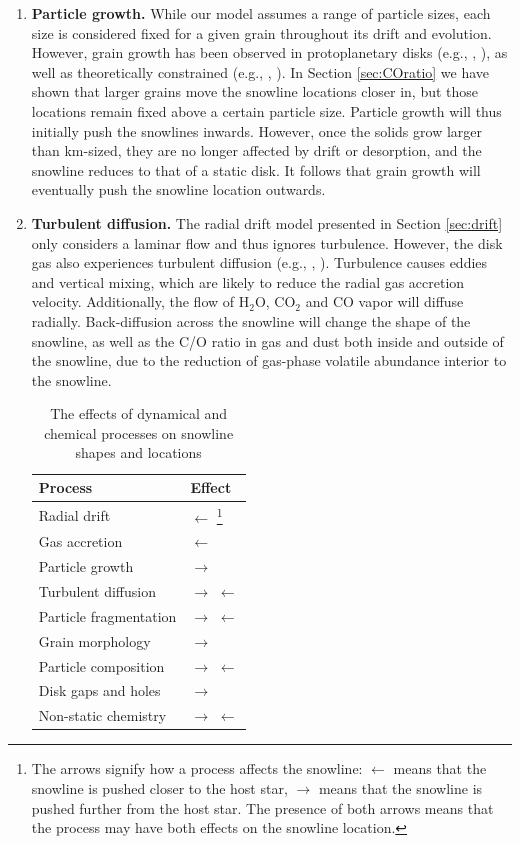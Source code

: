\documentclass[apj]{emulateapj}
\begin{document}
\begin{enumerate}
\item \textbf{Particle growth.} While our model assumes a range of particle sizes, each size is considered fixed for a given grain throughout its drift and evolution. However, grain growth has been observed in protoplanetary disks (e.g., \citealt{ricci10}, \citealt{perez12}), as well as theoretically constrained (e.g., \citealt{birnstiel10}, \citealt{birnstiel12}). In Section \ref{sec:COratio} we have shown that larger grains move the snowline locations closer in, but those locations remain fixed above a certain particle size. Particle growth will thus initially push the snowlines inwards. However, once the solids grow larger than km-sized, they are no longer affected by drift or desorption, and the snowline reduces to that of a static disk. It follows that grain growth will eventually push the snowline location outwards.

\item \textbf{Turbulent diffusion.} The radial drift model presented in Section \ref{sec:drift} only considers a laminar flow and thus ignores turbulence. However, the disk gas also experiences turbulent diffusion (e.g., \citealt{birnstiel12}, \citealt{alidib14}). Turbulence causes eddies and vertical mixing, which are likely to reduce the radial gas accretion velocity. Additionally, the flow of H$_2$O, CO$_2$ and CO vapor will diffuse radially. Back-diffusion across the snowline will change the shape of the snowline, as well as the C/O ratio in gas and dust both inside and outside of the snowline, due to the reduction of gas-phase volatile abundance interior to the snowline. 

\begin{table}[t!]
\caption{The effects of dynamical and chemical processes on snowline shapes and locations}
\begin{center}
\begin{tabular}{|l|l|}\hline
\textbf{Process} & \textbf{Effect} \\\hline
Radial drift & $\leftarrow$ \footnote{The arrows signify how a process affects the snowline: $\leftarrow$ means that the snowline is pushed closer to the host star, $\rightarrow$ means that the snowline is pushed further from the host star. The presence of both arrows means that the process may have both effects on the snowline location.} \\\hline
Gas accretion & $\leftarrow$ \\\hline
Particle growth & $\rightarrow$ \\\hline
Turbulent diffusion & $\rightarrow$ $\leftarrow$ \\\hline
Particle fragmentation & $\rightarrow$ $\leftarrow$ \\\hline
Grain morphology & $\rightarrow$ \\\hline
Particle composition & $\rightarrow$ $\leftarrow$ \\\hline
Disk gaps and holes & $\rightarrow$ \\\hline
Non-static chemistry & $\rightarrow$ $\leftarrow$ \\\hline
\end{tabular}


\end{center}
\end{table}
\end{enumerate}
\end{document}
